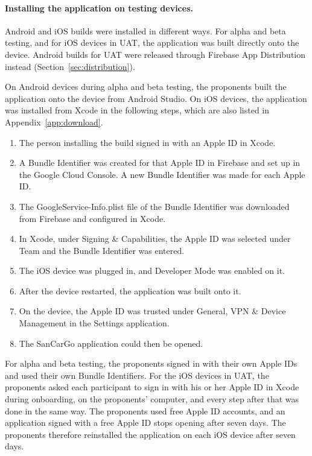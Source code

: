 \paragraph{Installing the application on testing devices.}\label{sec:install}
Android and iOS builds were installed in different ways. For alpha and beta testing, and for iOS devices in UAT, the application was built directly onto the device. Android builds for UAT were released through Firebase App Distribution instead (Section~\ref{sec:distribution}).

On Android devices during alpha and beta testing, the proponents built the application onto the device from Android Studio. On iOS devices, the application was installed from Xcode in the following steps, which are also listed in Appendix~\ref{app:download}.
\begin{enumerate}
    \item The person installing the build signed in with an Apple ID in Xcode.
    \item A Bundle Identifier was created for that Apple ID in Firebase and set up in the Google Cloud Console. A new Bundle Identifier was made for each Apple ID.
    \item The GoogleService-Info.plist file of the Bundle Identifier was downloaded from Firebase and configured in Xcode.
    \item In Xcode, under Signing \& Capabilities, the Apple ID was selected under Team and the Bundle Identifier was entered.
    \item The iOS device was plugged in, and Developer Mode was enabled on it.
    \item After the device restarted, the application was built onto it.
    \item On the device, the Apple ID was trusted under General, VPN \& Device Management in the Settings application.
    \item The SanCarGo application could then be opened.
\end{enumerate}
For alpha and beta testing, the proponents signed in with their own Apple IDs and used their own Bundle Identifiers. For the iOS devices in UAT, the proponents asked each participant to sign in with his or her Apple ID in Xcode during onboarding, on the proponents' computer, and every step after that was done in the same way. The proponents used free Apple ID accounts, and an application signed with a free Apple ID stops opening after seven days. The proponents therefore reinstalled the application on each iOS device after seven days.

